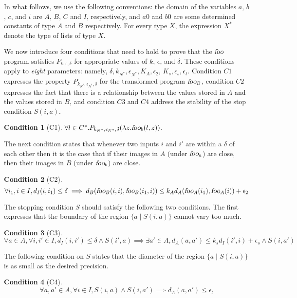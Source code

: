 \documentclass[copyright,creativecommons]{eptcs}
\newtheorem{hypo}{Condition}[section]
\newcommand{\foo}{\hbox{\sl foo}}
\newcommand{\fooa}{\hbox{\sl foo}_a}
\newcommand{\fooA}{\hbox{\sl foo}_A}
\newcommand{\foob}{\hbox{\sl foo}_b}
\newcommand{\fooB}{\hbox{\sl foo}_B}
\newcommand{\Cone}{C1}
\newcommand{\Ctwo}{C2}
\newcommand{\Cthree}{C3}
\newcommand{\Cfour}{C4}
\newcommand{\Kn}{k_{N^*}}
\newcommand{\En}{\epsilon_{N^*}}
\newcommand{\AND}{\mathrel{\wedge}}
\begin{document}
In what follows, we use the following conventions: the domain of the
variables $a$, $b$, $c$, and $i$ are $A$, $B$, $C$ and $I$,
respectively, and $a0$ and $b0$ are some determined constants of type
$A$ and $B$ respectively.  For every type $X$, the expression $X^*$
denote the type of lists of type $X$.

We now introduce four conditions that need to hold to prove that the
$\foo$ program satisfies $P_{k,\epsilon,\delta}$ for appropriate
values of $k$, $\epsilon$, and $\delta$.  These conditions apply to
{\em eight} parameters: namely, $\delta,\Kn,\En,K_A,\epsilon_2$,
$K_s,\epsilon_s,\epsilon_t$.  Condition $\Cone$ expresses the property
$P_{\Kn,\En,\delta}$ for the transformed program $\fooB$, condition
$\Ctwo$ expresses the fact that there is a relationship between the
values stored in $A$ and the values stored in $B$, and condition
$\Cthree$ and $\Cfour$ address the stability of the stop condition
$S(i,a)$.

\begin{hypo}[\Cone]\label{C1} \quad
$\forall l \in C^*. P_{\Kn,\En,\delta}(\lambda z. \foob(l,z))$.
\end{hypo}



The next condition states that whenever two inputs $i$ and $i'$ are
within a $\delta$ of each other then it is the case that if their
images in $A$ (under $\fooa$)  are close, then their images in $B$
(under $\foob$) are close.

\begin{hypo}[\Ctwo]\label{C2}
\[\forall i_1,i \in I, d_I(i,i_1) \leq \delta \implies
d_B( \fooB(i,i) , \fooB(i_1,i)) \leq k_A  d_A( \fooA(i_1) , \fooA(i)) + \epsilon_2
\]
\end{hypo}


The stopping condition $S$ should satisfy the following two
conditions.  The first expresses that the boundary of the region $\{a\;
|\; S(i,a)\}$ cannot vary too much.
\begin{hypo}[\Cthree]\label{C3}
\[\forall a \in A, \forall i,i' \in I,
d_I(i,i') \leq \delta \AND 
S(i',a) \implies \exists a' \in A, d_A(a,a') \leq k_s d_I(i',i) + \epsilon_s \AND 
S(i,a') \]
\end{hypo}

The following condition on $S$ states that the diameter of the region
$\{a\; |\; S(i,a)\}$ is as small as the desired precision.
\begin{hypo}[\Cfour]\label{C4}
\[\forall a,a' \in A,\forall i \in I, S(i,a) \AND S(i,a') \implies d_A(a,a') \leq \epsilon_t\]
\end{hypo}
\end{document}
